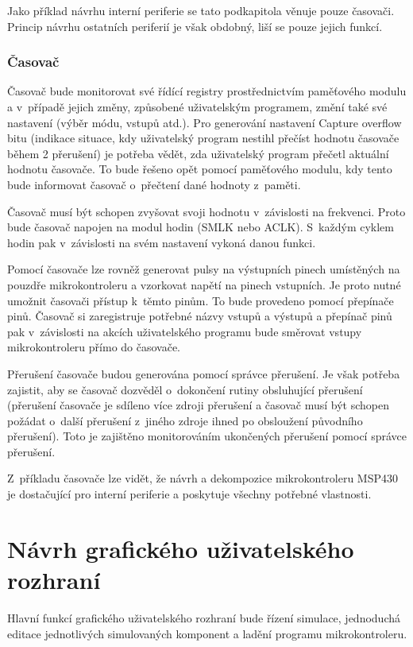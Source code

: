 Jako příklad návrhu interní periferie se tato podkapitola věnuje pouze časovači. Princip návrhu ostatních periferií je však obdobný, liší se pouze jejich funkcí.

\subsubsection{Časovač}

Časovač bude monitorovat své řídící registry prostřednictvím paměťového modulu a v~případě jejich změny, způsobené uživatelským programem, změní také své nastavení (výběr módu, vstupů atd.). Pro generování nastavení Capture overflow bitu (indikace situace, kdy uživatelský program nestihl přečíst hodnotu časovače během 2 přerušení) je potřeba vědět, zda uživatelský program přečetl aktuální hodnotu časovače. To bude řešeno opět pomocí paměťového modulu, kdy tento bude informovat časovač o~přečtení dané hodnoty z~paměti.

Časovač musí být schopen zvyšovat svoji hodnotu v~závislosti na frekvenci. Proto bude časovač napojen na modul hodin (SMLK nebo ACLK). S~každým cyklem
hodin pak v~závislosti na svém nastavení vykoná danou funkci.

Pomocí časovače lze rovněž generovat pulsy na výstupních pinech umístěných na pouzdře mikrokontroleru a vzorkovat napětí na pinech vstupních.
Je proto nutné umožnit časovači přístup k~těmto pinům. To bude provedeno pomocí přepínače pinů. Časovač si zaregistruje potřebné názvy vstupů a výstupů
a přepínač pinů pak v~závislosti na akcích uživatelského programu bude směrovat vstupy mikrokontroleru přímo do časovače.

Přerušení časovače budou generována pomocí správce přerušení. Je však potřeba zajistit, aby se časovač dozvěděl o~dokončení rutiny obsluhující přerušení
(přerušení časovače je sdíleno více zdroji přerušení a časovač musí být schopen požádat o~další přerušení z~jiného zdroje ihned po obsloužení původního přerušení). Toto je zajištěno monitorováním ukončených přerušení pomocí správce přerušení.

Z~příkladu časovače lze vidět, že návrh a dekompozice mikrokontroleru MSP430 je dostačující pro interní periferie a poskytuje všechny potřebné vlastnosti.

\section{Návrh grafického uživatelského rozhraní}

Hlavní funkcí grafického uživatelského rozhraní bude řízení simulace, jednoduchá editace jednotlivých simulovaných komponent a ladění programu mikrokontroleru.

